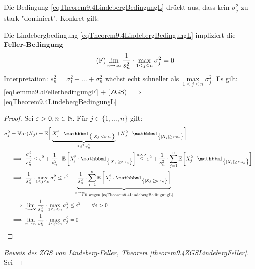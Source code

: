 \begin{bemerkung}
	 Die Bedingung \eqref{eqTheorem9.4LindebergBedingungL} drückt aus, dass kein $\sigma_j^2$ zu stark "dominiert".
	 Konkret gilt:
\end{bemerkung}

\begin{lemma}\label{lemma9.5}
	Die Lindebergbedingung \eqref{eqTheorem9.4LindebergBedingungL} impliziert die \textbf{Feller-Bedingung}
	\begin{align}\label{eqLemma9.5FellerbedingungF}\tag{F}
		\lim\limits_{n\to\infty}\frac{1}{s_n^2}\cdot\max\limits_{1\leq j\leq n}\sigma_j^2=0
	\end{align}
	\underline{Interpretation:}
	$s_n^2=\sigma_1^2+\ldots+\sigma_n^2$ wächst echt schneller als $\max\limits_{1\leq j\leq n}\sigma_j^2$.\nl
	Es gilt: \eqref{eqLemma9.5FellerbedingungF} + (ZGS) $\implies$ \eqref{eqTheorem9.4LindebergBedingungL}
\end{lemma}

\begin{proof}
	Sei $\varepsilon>0,n\in\mathbb{N}$. Für $j\in\lbrace 1,\ldots,n\rbrace$ gilt:
	\begin{align*}
		\sigma_j^2
		&=\Var(X_j)
		=\E\bigg[\underbrace{X_j^2\cdot\indi_{\big\lbrace|X_j|<\varepsilon\cdot s_n\big\rbrace}}_{\leq\varepsilon^2\cdot s_n^2}+X_j^2\cdot\indi_{\big\lbrace|X_j|\geq\varepsilon\cdot s_n\big\rbrace}\bigg]\\
		&\implies 
		\frac{\sigma_j^2}{s_n^2}
		\leq\varepsilon^2+\frac{1}{s_n^2}\cdot\E\left[X_j^2\cdot\indi_{\big\lbrace|X_j|\geq\varepsilon\cdot s_n\big\rbrace}\right]
		\overset{\text{grob}}\leq
		\varepsilon^2+\frac{1}{s_n^2}\cdot\sum\limits_{j=1}^n\E\left[X_j^2\cdot\indi_{\big\lbrace |X_j|\geq\varepsilon\cdot s_n\big\rbrace}\right]\\
		&\implies
		\frac{1}{s_n^2}\cdot\max\limits_{1\leq j\leq n}\sigma_j^2
		\leq\varepsilon^2+\underbrace{\frac{1}{s_n^2}\cdot\sum\limits_{j=1}^n\E\left[X_j^2\cdot\indi_{\big\lbrace|X_j|\geq\varepsilon\cdot s_n\big\rbrace}\right]}_{\overset{n\to\infty}{\longrightarrow}0\text{ wegen \eqref{eqTheorem9.4LindebergBedingungL}}}\\
		&\implies
		\limn\frac{1}{s_n^2}\cdot\max\limits_{1\leq j\leq n}\sigma_j^2
		\leq\varepsilon^2\qquad\forall\varepsilon>0\\
		&\implies\limn\frac{1}{s_n^2}\cdot\max\limits_{1\leq j\leq n}\sigma_j^2=0
	\end{align*}
\end{proof}

\begin{proof}[Beweis des ZGS von Lindeberg-Feller, Theorem \ref{theorem9.4ZGSLindebergFeller}]\enter
	Sei
\end{proof}

